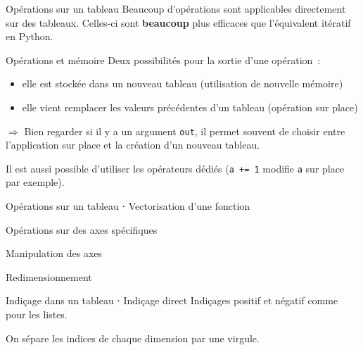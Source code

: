 \begin{frame}{Opérations sur un tableau}
  Beaucoup d'opérations sont applicables directement sur des tableaux. Celles-ci sont \textbf{beaucoup} plus efficaces que l'équivalent itératif en Python.
\end{frame}

\begin{frame}{Opérations et mémoire}
  Deux possibilités pour la sortie d'une opération~:
  \begin{itemize}
    \item elle est stockée dans un nouveau tableau (utilisation de nouvelle mémoire)
    \item elle vient remplacer les valeurs précédentes d'un tableau (opération sur place)
  \end{itemize}
  $\Rightarrow$ Bien regarder si il y a un argument \texttt{out}, il permet souvent de choisir entre l'application sur place et la création d'un nouveau tableau.

  Il est aussi possible d'utiliser les opérateurs dédiés (\texttt{a += 1} modifie \texttt{a} sur place par exemple).
\end{frame}

\begin{frame}{Opérations sur un tableau ⋅ Vectorisation d'une fonction}
\end{frame}

\begin{frame}{Opérations sur des axes spécifiques}
\end{frame}

\begin{frame}{Manipulation des axes}
\end{frame}

\begin{frame}{Redimensionnement}
\end{frame}

\begin{frame}{Indiçage dans un tableau ⋅ Indiçage direct}
  Indiçages positif et négatif comme pour les listes.

  On sépare les indices de chaque dimension par une virgule.

\end{frame}

